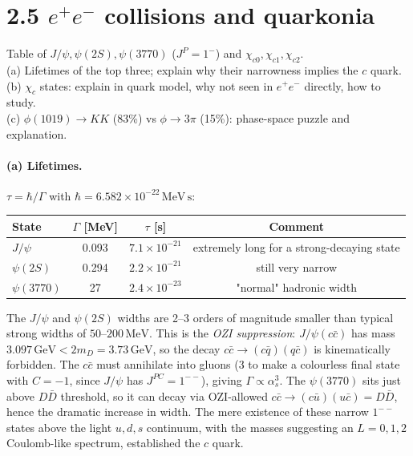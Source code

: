 \documentclass[11pt]{article}
\newcommand{\Q}[1]{\begin{question}#1\end{question}}
\newcommand{\MeV}{\,\mathrm{MeV}}
\newcommand{\GeV}{\,\mathrm{GeV}}
\begin{document}
\section*{2.5 \quad $e^+e^-$ collisions and quarkonia}

\Q{Table of $J/\psi,\psi(2S),\psi(3770)$ ($J^P=1^-$) and $\chi_{c0},\chi_{c1},\chi_{c2}$.\\
(a) Lifetimes of the top three; explain why their narrowness implies the $c$ quark.\\
(b) $\chi_c$ states: explain in quark model, why not seen in $e^+e^-$ directly, how to study.\\
(c) $\phi(1019)\to KK$ (83\%) vs $\phi\to 3\pi$ (15\%): phase-space puzzle and explanation.}

\paragraph{(a) Lifetimes.} $\tau=\hbar/\Gamma$ with $\hbar=6.582\times 10^{-22}\MeV\,\mathrm{s}$:
\begin{center}
\begin{tabular}{@{}lccc@{}}\hline
State & $\Gamma$ [MeV] & $\tau$ [s] & Comment\\\hline
$J/\psi$ & 0.093 & $7.1\times 10^{-21}$ & extremely long for a strong-decaying state\\
$\psi(2S)$ & 0.294 & $2.2\times 10^{-21}$ & still very narrow\\
$\psi(3770)$ & 27 & $2.4\times 10^{-23}$ & "normal" hadronic width\\\hline
\end{tabular}
\end{center}
The $J/\psi$ and $\psi(2S)$ widths are 2--3 orders of magnitude smaller than typical strong widths of $50$--$200\MeV$. This is the \emph{OZI suppression}: $J/\psi(c\bar c)$ has mass $3.097\GeV<2 m_D=3.73\GeV$, so the decay $c\bar c\to (c\bar q)(q\bar c)$ is kinematically forbidden. The $c\bar c$ must annihilate into gluons (3 to make a colourless final state with $C=-1$, since $J/\psi$ has $J^{PC}=1^{--}$), giving $\Gamma\propto\alpha_s^{3}$. The $\psi(3770)$ sits just above $D\bar D$ threshold, so it can decay via OZI-allowed $c\bar c\to(c\bar u)(u\bar c)=D\bar D$, hence the dramatic increase in width. The mere existence of these narrow $1^{--}$ states above the light $u,d,s$ continuum, with the masses suggesting an $L=0,1,2$ Coulomb-like spectrum, established the $c$ quark.
\end{document}
